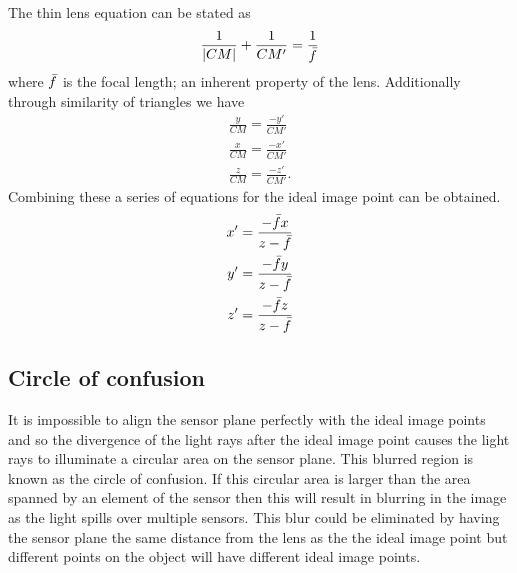 \documentclass[[12pt,oneside,openany,a4paper, %
\newcommand*\mean[1]{\bar{#1}} %
\begin{document}

The thin lens equation can be stated as
\begin{equation}
\frac{1}{|CM|} + \frac{1}{CM'} = \frac{1}{\mean{f}}
\end{equation}
where $\mean{f}$ is the focal length; an inherent property of the lens. Additionally through similarity of triangles we have
\begin{align}
\frac{y}{CM} = \frac{-y'}{CM'}\\
\frac{x}{CM} = \frac{-x'}{CM'}\\
\frac{z}{CM} = \frac{-z'}{CM'}.
\end{align}
Combining these a series of equations for the ideal image point can be obtained.
\begin{align}
\label{eq:optics y'2y}
\begin{split}
x'&=\frac{-\mean{f} x}{z - \mean{f}} \\
y'&=\frac{-\mean{f} y}{z - \mean{f}} \\
z'&=\frac{-\mean{f} z}{z - \mean{f}}
\end{split}
\end{align}

\subsection{Circle of confusion}
It is impossible to align the sensor plane perfectly with the ideal image points and so the divergence of the light rays after the ideal image point causes the light rays to illuminate a circular area on the sensor plane. This blurred region is known as the circle of confusion. If this circular area is larger than the area spanned by an element of the sensor then this will result in blurring in the image as the light spills over multiple sensors. This blur could be eliminated by having the sensor plane the same distance from the lens as the the ideal image point but different points on the object will have different ideal image points.
\end{document}
